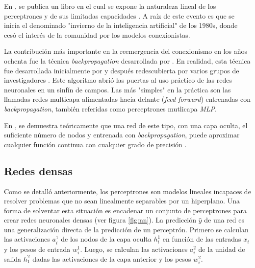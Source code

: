 En \citeyear{minsky1969perceptrons}, se publica un libro en el cual se expone la naturaleza lineal de los perceptrones
y de sus limitadas capacidades \parencite{minsky1969perceptrons}. A raíz de este evento es que se inicia el denominado "invierno de la inteligencia
artificial" de los 1980s, donde cesó el interés de la comunidad por los modelos conexionistas.

La contribución más importante en la reemergencia del conexionismo en los años ochenta fue la técnica {\it
backpropagation} desarrollada por \cite{rumelhart1986learning}. En realidad, esta técnica fue desarrollada inicialmente
por \cite{werbos1974beyond} y después redescubierta por varios grupos de investigadores \parencite{lecun1985learning, rumelhart1986learning}. Este algoritmo abrió las puertas al uso práctico de las redes
neuronales en un sinfín de campos. Las más "simples" en la práctica son las llamadas redes multicapa alimentadas hacia
delante ({\it feed forward}) entrenadas con {\it backpropagation}, también referidas como perceptrones mutlicapa {\it
        MLP}.

En \citeyear{funahashi1989approximate}, se demuestra teóricamente que una red de este tipo, con una capa oculta, el
suficiente número de nodos y entrenada con {\it backpropagation}, puede aproximar cualquier función continua con
cualquier grado de precisión \parencite{funahashi1989approximate}.

\subsection{Redes densas}
Como se detalló anteriormente, los perceptrones son modelos lineales incapaces de resolver problemas que no sean
linealmente separables por un hiperplano. Una forma de solventar esta situación es encadenar un conjunto de
perceptrones para crear redes neuronales densas (ver figura \ref{fig:nn}). La predicción $\hat{y}$ de una red es una
generalización directa de la predicción de un perceptrón. Primero se calculan las activaciones $a_i^1$ de los nodos de
la capa oculta $h_i^1$ en función de las entradas $x_i$ y los pesos de entrada $w_i^1$. Luego, se calculan las
activaciones $a_i^2$ de la unidad de salida $h_1^2$ dadas las activaciones de la capa anterior y los pesos $w_i^2$.

